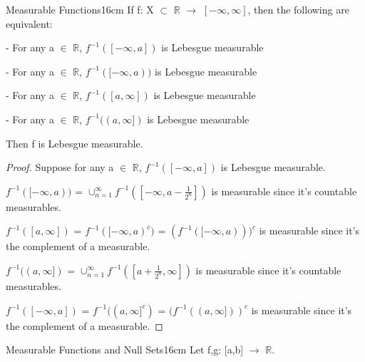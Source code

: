     \newpage



    \begin{wtheorem}{Measurable Functions}{16cm}
        If f: X $\subset$ $\mathbb{R}$ $\rightarrow$ $[-\infty,\infty]$, then
        the following are equivalent:

        \hspace{0.5cm}
        - For any a $\in$ $\mathbb{R}$, $f^{-1}([-\infty,a])$
        is Lebesgue measurable

        \hspace{0.5cm}
        - For any a $\in$ $\mathbb{R}$, $f^{-1}([-\infty,a))$
        is Lebesgue measurable

        \hspace{0.5cm}
        - For any a $\in$ $\mathbb{R}$, $f^{-1}([a,\infty])$
        is Lebesgue measurable

        \hspace{0.5cm}
        - For any a $\in$ $\mathbb{R}$, $f^{-1}((a,\infty])$
        is Lebesgue measurable

        Then f is {\color{lblue} Lebesgue measurable}.
    \end{wtheorem}

    \begin{proof}
        Suppose for any a $\in$ $\mathbb{R}$, $f^{-1}([-\infty,a])$
        is Lebesgue measurable.

        $f^{-1}([-\infty,a))$
        = $\cup_{n=1}^{\infty} f^{-1}([-\infty,a-\frac{1}{2^n}])$
        is measurable since it's countable measurables. 

        $f^{-1}([a,\infty])$
        = $f^{-1}([-\infty,a)^c)$
        = $(f^{-1}([-\infty,a)))^c$
        is measurable since it's the complement of a measurable.

        $f^{-1}((a,\infty])$
        = $\cup_{n=1}^{\infty} f^{-1}([a+\frac{1}{2^n},\infty])$
        is measurable since it's countable measurables.

        $f^{-1}([-\infty,a])$
        = $f^{-1}((a,\infty]^c)$
        = $(f^{-1}((a,\infty]))^c$
        is measurable since it's the complement of a measurable.
    \end{proof}

    \vspace{0.5cm}



    \begin{wtheorem}{Measurable Functions and Null Sets}{16cm}
        Let f,g: [a,b] $\rightarrow$ $\mathbb{R}$.
    \end{wtheorem}

